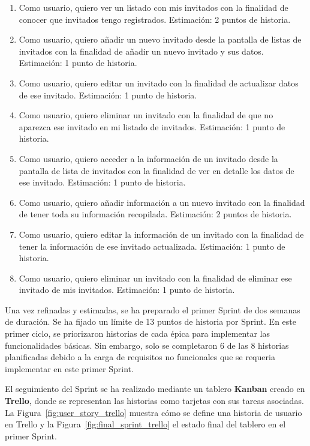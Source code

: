 \begin{enumerate}
  \item Como usuario, quiero ver un listado con mis invitados con la finalidad de conocer que invitados tengo registrados. Estimación: 2 puntos de historia.
  \item Como usuario, quiero añadir un nuevo invitado desde la pantalla de listas de invitados con la finalidad de añadir un nuevo invitado y sus datos. Estimación: 1 punto de historia.
  \item Como usuario, quiero editar un invitado con la finalidad de actualizar datos de ese invitado. Estimación: 1 punto de historia.
  \item Como usuario, quiero eliminar un invitado con la finalidad de que no aparezca ese invitado en mi listado de invitados. Estimación: 1 punto de historia.
  \item Como usuario, quiero acceder a la información de un invitado desde la pantalla de lista de invitados con la finalidad de ver en detalle los datos de ese invitado. Estimación: 1 punto de historia.
  \item Como usuario, quiero añadir información a un nuevo invitado con la finalidad de tener toda su información recopilada. Estimación: 2 puntos de historia.
  \item Como usuario, quiero editar la información de un invitado con la finalidad de tener la información de ese invitado actualizada. Estimación: 1 punto de historia.
  \item Como usuario, quiero eliminar un invitado con la finalidad de eliminar ese invitado de mis invitados. Estimación: 1 punto de historia.
\end{enumerate}

Una vez refinadas y estimadas, se ha preparado el primer Sprint de dos semanas de duraci\'on. Se ha fijado un l\'imite de 13 puntos de historia por Sprint. En este primer ciclo, se priorizaron historias de cada \'epica para implementar las funcionalidades b\'asicas. Sin embargo, solo se completaron 6 de las 8 historias planificadas debido a la carga de requisitos no funcionales que se requeria implementar en este primer Sprint.

El seguimiento del Sprint se ha realizado mediante un tablero \textbf{Kanban} creado en \textbf{Trello}, donde se representan las historias como tarjetas con sus tareas asociadas. La Figura~\ref{fig:user_story_trello} muestra cómo se define una historia de usuario en Trello y la Figura~\ref{fig:final_sprint_trello} el estado final del tablero en el primer Sprint.

